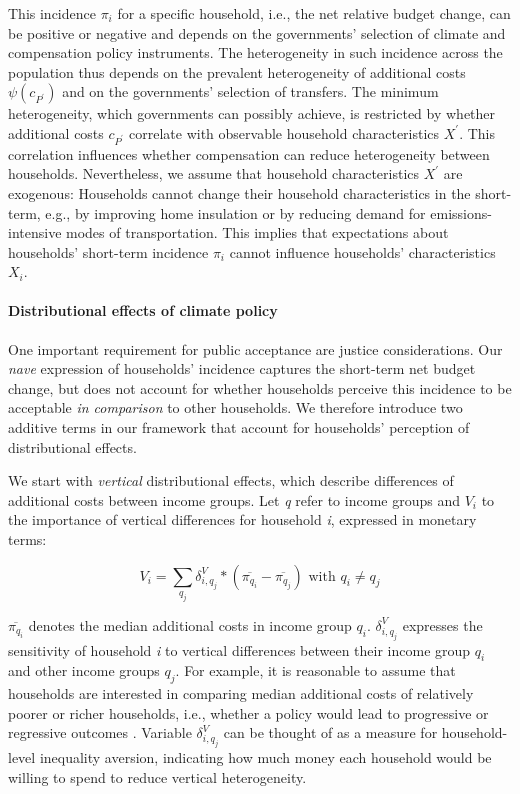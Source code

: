 \documentclass[12pt, a4paper]{article}
\begin{document}
This incidence $\pi_{i}$ for a specific household, i.e., the net relative budget change, can be positive or negative and depends on the governments' selection of climate and compensation policy instruments. The heterogeneity in such incidence across the population thus depends on the prevalent heterogeneity of additional costs $\psi(c_{P^{\prime}})$ and on the governments' selection of transfers. The minimum heterogeneity, which governments can possibly achieve, is restricted by whether additional costs $c_{P^{\prime}}$ correlate with observable household characteristics $X^{\prime}$. This correlation influences whether compensation can reduce heterogeneity between households. Nevertheless, we assume that household characteristics $X^{\prime}$ are exogenous: Households cannot change their household characteristics in the short-term, e.g., by improving home insulation or by reducing demand for emissions-intensive modes of transportation. This implies that expectations about households' short-term incidence $\pi_{i}$ cannot influence households' characteristics $X_{i}$.

\paragraph{Distributional effects of climate policy}
One important requirement for public acceptance are justice considerations. Our \textit{nave} expression of households' incidence captures the short-term net budget change, but does not account for whether households perceive this incidence to be acceptable \textit{in comparison} to other households. We therefore introduce two additive terms in our framework that account for households' perception of distributional effects. 

We start with \textit{vertical} distributional effects, which describe differences of additional costs between income groups. Let \textit{q} refer to income groups and $V_{i}$ to the importance of vertical differences for household \textit{i}, expressed in monetary terms:

\begin{equation}\label{eq_V}
    V_{i} = \sum_{q_{j}} \delta_{i,q_{j}}^{V} * (\overline{\pi_{q_{i}}}-\overline{\pi_{q_{j}}}) \text{ with } q_{i} \neq q_{j}  
\end{equation}

$\overline{\pi_{q_{i}}}$ denotes the median additional costs in income group $q_{i}$. $\delta_{i,q_{j}}^{V}$ expresses the sensitivity of household \textit{i} to vertical differences between their income group $q_{i}$ and other income groups $q_{j}$. For example, it is reasonable to assume that households are interested in comparing median additional costs of relatively poorer or richer households, i.e., whether a policy would lead to progressive or regressive outcomes \autocite[e.g.,][]{Dechezlepretre.2022}. Variable $\delta_{i,q_{j}}^{V}$ can be thought of as a measure for household-level inequality aversion, indicating how much money each household would be willing to spend to reduce vertical heterogeneity.
\end{document}
